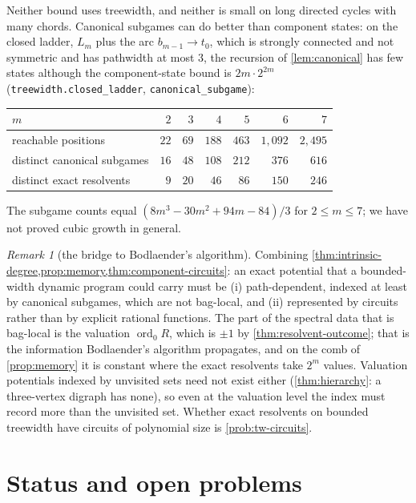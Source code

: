 \documentclass[11pt]{amsart}
\theoremstyle{plain}
\theoremstyle{definition}
\theoremstyle{remark}
\newtheorem{remark}[theorem]{Remark}
\numberwithin{equation}{section}
\newcommand{\code}[1]{{\ttfamily\nolinkurl{#1}}}
\newcommand{\ord}{\operatorname{ord}}
\begin{document}
Neither bound uses treewidth, and neither is small on long directed cycles with many chords. Canonical subgames can do better than component states: on the closed ladder, $L_m$ plus the arc $b_{m-1}\to t_0$, which is strongly connected and not symmetric and has pathwidth at most $3$, the recursion of \cref{lem:canonical} has few states although the component-state bound is $2m\cdot2^{2m}$ \textup{(}\code{treewidth.closed_ladder}, \code{canonical_subgame}\textup{)}:
\begin{center}\small
\begin{tabular}{@{}lrrrrrr@{}}
\toprule
$m$ & $2$ & $3$ & $4$ & $5$ & $6$ & $7$\\ \midrule
reachable positions & $22$ & $69$ & $188$ & $463$ & $1{,}092$ & $2{,}495$\\
distinct canonical subgames & $16$ & $48$ & $108$ & $212$ & $376$ & $616$\\
distinct exact resolvents & $9$ & $20$ & $46$ & $86$ & $150$ & $246$\\
\bottomrule
\end{tabular}
\end{center}
The subgame counts equal $(8m^{3}-30m^{2}+94m-84)/3$ for $2\le m\le7$; we have not proved cubic growth in general.

\begin{remark}[the bridge to Bodlaender's algorithm]\label{rem:bodlaender}
Combining \cref{thm:intrinsic-degree,prop:memory,thm:component-circuits}: an exact potential that a bounded-width dynamic program could carry must be (i) path-dependent, indexed at least by canonical subgames, which are not bag-local, and (ii) represented by circuits rather than by explicit rational functions. The part of the spectral data that is bag-local is the valuation $\ord_0R$, which is $\pm1$ by \cref{thm:resolvent-outcome}; that is the information Bodlaender's algorithm propagates, and on the comb of \cref{prop:memory} it is constant where the exact resolvents take $2^{m}$ values. Valuation potentials indexed by unvisited sets need not exist either (\cref{thm:hierarchy}: a three-vertex digraph has none), so even at the valuation level the index must record more than the unvisited set. Whether exact resolvents on bounded treewidth have circuits of polynomial size is \cref{prob:tw-circuits}.
\end{remark}

\section{Status and open problems}\label{sec:open}
\end{document}

